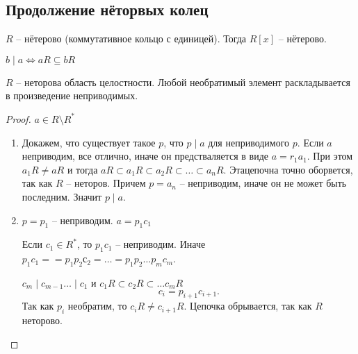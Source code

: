\documentclass[12pt]{report}
\begin{document}
\subsection{Продолжение нёторвых колец}
\begin{thm}
    $ R$ -- нётерово (коммутативное кольцо с единицей). Тогда $ R[x]$ -- нётерово.
\end{thm}
\begin{note}
    $ b \mid a \Leftrightarrow aR \subseteq bR$
\end{note}
\begin{thm}
    $ R$ -- неторова область целостности. Любой необратимый элемент раскладывается в произведение неприводимых.
\end{thm}
\begin{proof}
    $ a \in  R \setminus R^{*}$ 
    \begin{enumerate}
	\item Докажем, что существует такое $ p$, что $ p \mid a$ для неприводимого $ p$.
	     Если $ a$ неприводим, все отлично, иначе он предстваляется в виде
	     $ a = r_1 a_1$.
	     При этом $ a_1R \ne aR$ и тогда $ aR \subset a_1R \subset  a_2R \subset \ldots \subset a_nR$. Этацепочна точно оборвется, так как $ R$ -- неторов. Причем $ p = a_n$ -- неприводим, иначе он не может быть последним.
	     Значит $ p \mid a$.
	 \item $ p = p_1$ -- неприводим.
	     $ a = p_1 c_1 $

	     Если $ c_1 \in  R^{*}$, то $ p_1c_1 $ -- неприводим.
	     Иначе $ p_1c_1 = = p_1 p_2с_2 = \ldots  = p_1 p_2 \ldots p_m c_m$.

	     $ c_m \mid c_{m-1} \ldots \mid c_1$ и $ c_1R \subset c_2R \subset  \ldots c_m R$  %
	     \[
	     c_i = p_{i+1} c_{i+1}
	     .\] 
	     Так как $ p_i$ необратим, то $ c_i R \ne c_{i+1}R$. Цепочка  обрывается, так как  $ R$ неторово.
    \end{enumerate}
\end{proof}
\end{document}
